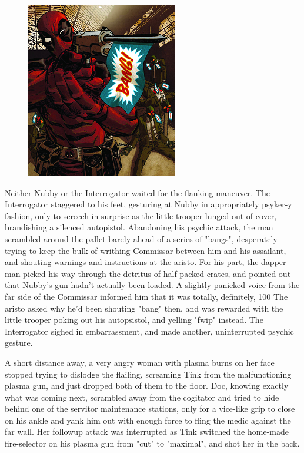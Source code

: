 \begin{figure}
	\begin{center}
		\includegraphics[width=\figwidth]{pics/21/95.png}
	\end{center}
\end{figure}
Neither Nubby or the Interrogator waited for the flanking maneuver. 
The Interrogator staggered to his feet, gesturing at Nubby in appropriately psyker-y fashion, only to screech in surprise as the little trooper lunged out of cover, brandishing a silenced autopistol. 
Abandoning his psychic attack, the man scrambled around the pallet barely ahead of a series of "bangs", desperately trying to keep the bulk of writhing Commissar between him and his assailant, and shouting warnings and instructions at the aristo. 
For his part, the dapper man picked his way through the detritus of half-packed crates, and pointed out that Nubby's gun hadn't actually been loaded. 
A slightly panicked voice from the far side of the Commissar informed him that it was totally, definitely, 100%
The aristo asked why he'd been shouting "bang" then, and was rewarded with the little trooper poking out his autopsistol, and yelling "fwip" instead. 
The Interrogator sighed in embarrassment, and made another, uninterrupted psychic gesture.

A short distance away, a very angry woman with plasma burns on her face stopped trying to dislodge the flailing, screaming Tink from the malfunctioning plasma gun, and just dropped both of them to the floor. 
Doc, knowing exactly what was coming next, scrambled away from the cogitator and tried to hide behind one of the servitor maintenance stations, only for a vice-like grip to close on his ankle and yank him out with enough force to fling the medic against the far wall. 
Her followup attack was interrupted as Tink switched the home-made fire-selector on his plasma gun from "cut" to "maximal", and shot her in the back.

